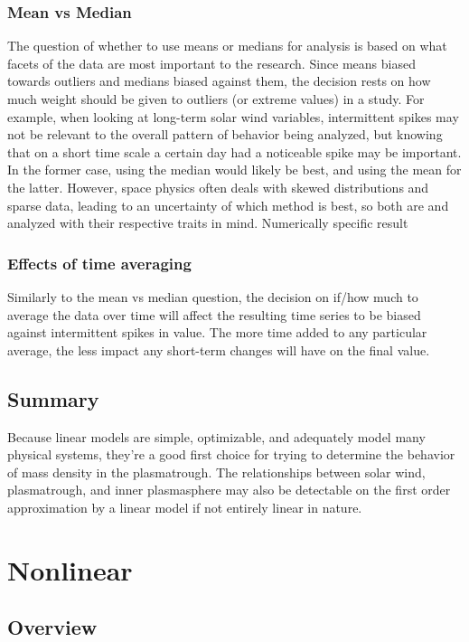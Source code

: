 \subsubsection{Mean vs Median}
The question of whether to use means or medians for analysis is based on what facets of the data are most important to the research. Since means biased towards outliers and medians biased against them, the decision rests on how much weight should be given to outliers (or extreme values) in a study. For example, when looking at long-term solar wind variables, intermittent spikes may not be relevant to the overall pattern of behavior being analyzed, but knowing that on a short time scale a certain day had a noticeable spike may be important. In the former case, using the median would likely be best, and using the mean for the latter. However, space physics often deals with skewed distributions and sparse data, leading to an uncertainty of which method is best, so both are and analyzed with their respective traits in mind.
\note Numerically specific result

\subsubsection{Effects of time averaging}
Similarly to the mean vs median question, the decision on if/how much to average the data over time will affect the resulting time series to be biased against intermittent spikes in value. The more time added to any particular average, the less impact any short-term changes will have on the final value.

\subsection{Summary}
Because linear models are simple, optimizable, and adequately model many physical systems, they're a good first choice for trying to determine the behavior of mass density in the plasmatrough. The relationships between solar wind, plasmatrough, and inner plasmasphere may also be detectable on the first order approximation by a linear model if not entirely linear in nature.


\section{Nonlinear}

\subsection{Overview}

